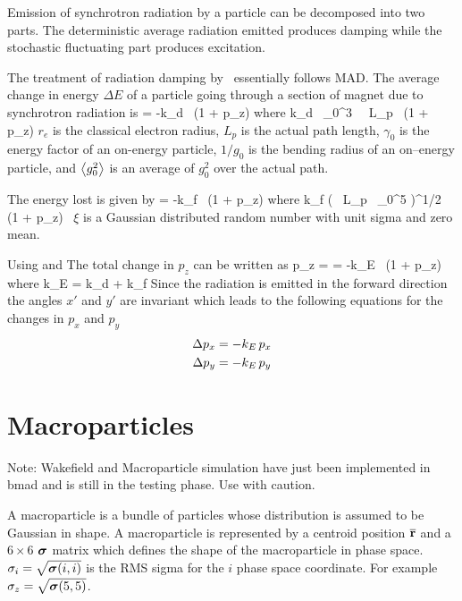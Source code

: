 Emission of synchrotron radiation by a particle can be decomposed into
two parts. The deterministic average radiation emitted produces damping
while the stochastic fluctuating part produces excitation\cite{b:jowett}.

The treatment of radiation damping by \bmad\ essentially follows MAD.
The average change in energy $\Delta E$ of a particle going through a
section of magnet due to synchrotron radiation is
\Begineq
   = -k_d \, (1 + p_z)
\Endeq
where
\Begineq
  k_d \equiv {} \, \gamma_0^3 \,  \, L_p \,  
  (1 + p_z)
  \label{k2r3g}
\Endeq
$r_e$ is the classical electron radius, $L_p$ is the actual path
length, $\gamma_0$ is the energy factor of an on-energy particle, $1/g_0$
is the bending radius of an on--energy particle, and $\left\langle g_0^2 \right\rangle$ is an
average of $g_0^2$ over the actual path.

The energy lost is given by
\Begineq
   = -k_f \, (1 + p_z)
\Endeq
where
\Begineq
  k_f \equiv \left(  \, 
  L_p \, \gamma_0^5  \right)^{1/2} \, (1 + p_z) \, \xi
  \label{k55rh}
\Endeq
$\xi$ is a Gaussian distributed random number with unit sigma and zero mean.

Using  and  The total change in $p_z$ can be written as
\Begineq
  \Delta p_z =  = -k_E \, (1 + p_z)
\Endeq
where
\Begineq
  k_E = k_d + k_f
\Endeq
Since the radiation is emitted in the forward direction the angles
$x'$ and $y'$ are invariant which leads to the following equations for
the changes in $p_x$ and $p_y$
\begin{align}
  \Delta p_x &= -k_E \, p_x \nonumber \\
  \Delta p_y &= -k_E \, p_y 
\end{align}

\section{Macroparticles}
\label{s:macro}

Note: Wakefield and Macroparticle simulation have just been implemented
in bmad and is still in the testing phase. Use with caution.

A macroparticle\cite{b:transport_appendix} is a bundle of particles
whose distribution is assumed to be Gaussian in shape. A macroparticle
is represented by a centroid position $\overline{{\bf r}}$ and a $6 \times 6$
$\boldsymbol{\sigma}$ matrix which defines the shape of the macroparticle in
phase space. $\sigma_i = \sqrt{\boldsymbol{\sigma}(i,i)}$ is the RMS sigma for the $i$\Th
phase space coordinate. For example $\sigma_z = \sqrt{\boldsymbol{\sigma}(5,5)}$.


